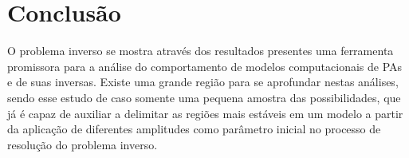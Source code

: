 \chapter{Conclusão} \label{cha:conclusao}
O problema inverso se mostra através dos resultados presentes uma ferramenta promissora para a análise do comportamento de modelos computacionais de PAs e de suas inversas. Existe uma grande região para se aprofundar nestas análises, sendo esse estudo de caso somente uma pequena amostra das possibilidades, que já é capaz de auxiliar a delimitar as regiões mais estáveis em um modelo a partir da aplicação de diferentes amplitudes como parâmetro inicial no processo de resolução do problema inverso.
